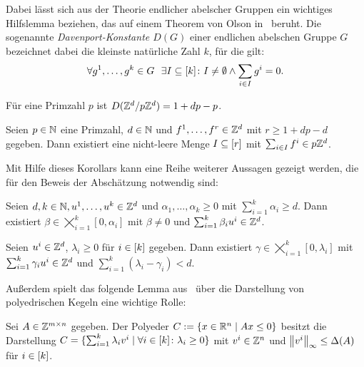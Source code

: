 Dabei lässt sich aus der Theorie endlicher abelscher Gruppen ein wichtiges Hilfslemma beziehen, das auf einem Theorem von Olson in~\cite{Olson1969} beruht.
Die sogenannte \emph{Davenport-Konstante $D(G)$} einer endlichen abelschen Gruppe $G$ bezeichnet dabei die kleinste natürliche Zahl $k$, für die gilt:
$$
\forall g^1,\dots,g^k \in G~~\exists I\subseteq[k]\colon I\neq\emptyset \wedge \sum_{i\in I}g^i=0 .
$$
\renewcommand{\thetheorem}{2.6}
\begin{theorem}[Olson, 1969]
	Für eine Primzahl $p$ ist $D(\mathbb{Z}^d/p\mathbb{Z}^d)=1+dp-p$.
\end{theorem}
\renewcommand{\thecorollary}{2.7}
\begin{corollary}
	Seien $p\in\mathbb{N}$ eine Primzahl, $d\in\mathbb{N}$ und $f^1,\dots,f^r\in\mathbb{Z}^d$ mit $r\geq 1+dp-d$ gegeben.
	Dann existiert eine nicht-leere Menge $I\subseteq[r]$ mit $\sum_{i\in I}f^i\in p\mathbb{Z}^d$.
\end{corollary}

Mit Hilfe dieses Korollars kann eine Reihe weiterer Aussagen gezeigt werden, die für den Beweis der Abschätzung notwendig sind:

\renewcommand{\thelemma}{2.8}
\begin{lemma}\label{lem:olson}
	Seien $d,k\in\mathbb{N}, u^1,\dots, u^k\in\mathbb{Z}^d$ und $\alpha_1,\dots,\alpha_k\geq0$ mit $\sum_{i=1}^k \alpha_i\geq d$.
	Dann existiert $\beta\in\bigtimes_{i=1}^k[0,\alpha_i]$ mit $\beta\neq0$ und $\sum_{i=1}^k\beta_i u^i \in\mathbb{Z}^d$.
\end{lemma}

\renewcommand{\thelemma}{2.9}
\begin{lemma}\label{lem:maxgamma}
	Seien $u^i\in\mathbb{Z}^d$, $\lambda_i\geq0$ für $i\in[k]$ gegeben.
	Dann existiert $\gamma\in\bigtimes_{i=1}^k [0,\lambda_i]$ mit $\sum_{i=1}^k \gamma_i u^i\in\mathbb{Z}^d$ und  $\sum_{i=1}^k(\lambda_i-\gamma_i)<d$.
\end{lemma}

Außerdem spielt das folgende Lemma aus~\cite[Lemma 5.4]{Korte2012} über die Darstellung von polyedrischen Kegeln eine wichtige Rolle:

\renewcommand{\thelemma}{2.10}
\begin{lemma}
	Sei $A\in\mathbb{Z}^{m\times n}$ gegeben.
	Der Polyeder $C:=\{ x\in\mathbb{R}^n \mid A x\leq 0 \}$ besitzt die Darstellung $C=\{\sum_{i=1}^k\lambda_i v^i \mid \forall i\in[k] \colon\lambda_i\geq0 \}$ mit $v^i\in\mathbb{Z}^n$ und $\left\lVert v^i\right\rVert_\infty\leq\Delta(A)$ für $i\in[k]$.
\end{lemma}

